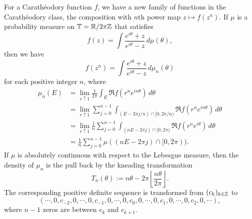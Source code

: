 \documentclass[a4paper]{article}
\begin{document}
\begin{ex}
For a Carath\'eodory function $f$, we have a new family of functions in the Carath\'eodory class, the composition with $n$th power map $z\mapsto f(z^n)$.
If $\mu$ is a probability measure on $\mathbb{T}=\mathbb{R}/2\pi\mathbb{Z}$ that satisfies
\[f(z)=\int\frac{e^{i\theta}+z}{e^{i\theta}-z}\,d\mu(\theta),\]
then we have 
\[f(z^n)=\int\frac{e^{i\theta}+z}{e^{i\theta}-z}\,d\mu_n(\theta)\]
for each positive integer $n$, where
\begin{align*}
\mu_n(E)&=\lim_{r\uparrow1}\frac1{2\pi}\int_E\Re f(r^ne^{in\theta})\,d\theta\\
&=\lim_{r\uparrow1}\sum_{j=0}^{n-1}\int_{(E-2\pi j/n)\cap[0,2\pi/n)}\Re f(r^ne^{in\theta})\,d\theta\\
&=\lim_{r\uparrow1}\frac1n\sum_{j=0}^{n-1}\int_{(nE-2\pi j)\cap[0,2\pi)}\Re f(r^ne^{i\theta})\,d\theta\\
&=\frac1n\sum_{j=0}^{n-1}\mu((nE-2\pi j)\cap[0,2\pi)).
\end{align*}
If $\mu$ is absolutely continuous with respect to the Lebesgue measure, then the density of $\mu_n$ is the pull back by the kneading transformation
\[T_n(\theta):=n\theta-2\pi\left\lfloor\frac{n\theta}{2\pi}\right\rfloor.\]
The corresponding positive definite sequence is transformed from $(c_k)_{k\in\mathbb{Z}}$ to
\[(\cdots,0,c_{-2},0,\cdots,0,c_{-1},0,\cdots,0,c_0,0,\cdots,0,c_1,0,\cdots,0,c_2,0,\cdots),\]
where $n-1$ zeros are between $c_k$ and $c_{k+1}$.
\end{ex}
\end{document}
